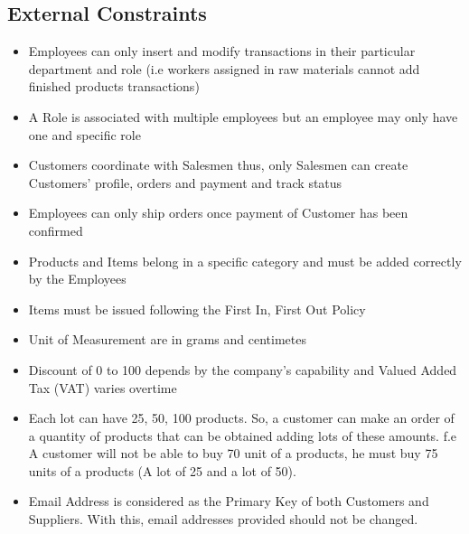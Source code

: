 \subsection{External Constraints}
\begin{itemize}
\item Employees can only insert and modify transactions in their particular department and role (i.e workers assigned in raw materials cannot add finished products transactions)
\item A Role is associated with multiple employees but an employee may only have one and specific role
\item Customers coordinate with Salesmen thus, only Salesmen can create Customers' profile, orders and payment and track status
\item Employees can only ship orders once payment of Customer has been confirmed
\item Products and Items belong in a specific category and must be added correctly by the Employees
\item Items must be issued following the First In, First Out Policy
\item Unit of Measurement are in grams and centimetes
\item Discount of 0 to 100 depends by the company's capability and Valued Added Tax (VAT) varies overtime
\item Each lot can have 25, 50, 100 products. So, a customer can make an order of a quantity of products that can be obtained adding lots of these amounts. f.e A customer will not be able to buy 70 unit of a products, he must buy 75 units of a products (A lot of 25 and a lot of 50).
\item Email Address is considered as the Primary Key of both Customers and Suppliers. With this, email addresses provided should not be changed.
\end{itemize}